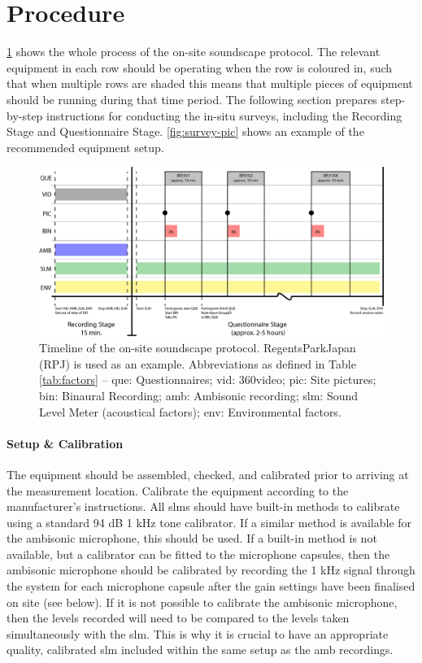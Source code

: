 \section{Procedure}
 \label{sec:proc}

 \cref{fig:timeline} shows the whole process of the on-site soundscape protocol. The relevant equipment in each row should be operating when the row is coloured in, such that when multiple rows are shaded this means that multiple pieces of equipment should be running during that time period. The following section prepares step-by-step instructions for conducting the in-situ surveys, including the Recording Stage and Questionnaire Stage. \cref{fig:survey-pic} shows an example of the recommended equipment setup.

 \begin{figure}[h]
   \centering
   \includegraphics[width=\textwidth]{Figures/Survey-Diagram_V2}
   \caption{Timeline of the on-site soundscape protocol. RegentsParkJapan (RPJ) is used as an example. Abbreviations as defined in Table \ref{tab:factors} -- \gls{que}: Questionnaires; \gls{vid}: 360\degree video; \gls{pic}: Site pictures; \gls{bin}: Binaural Recording; \gls{amb}: Ambisonic recording; \gls{slm}: Sound Level Meter (acoustical factors); \gls{env}: Environmental factors. \label{fig:timeline}}
 \end{figure}

 \paragraph*{Setup \& Calibration} The equipment should be assembled, checked, and calibrated prior to arriving at the measurement location. Calibrate the equipment according to the manufacturer's instructions. All \gls{slm}s should have built-in methods to calibrate using a standard 94 dB 1 kHz tone calibrator. If a similar method is available for the ambisonic microphone, this should be used. If a built-in method is not available, but a calibrator can be fitted to the microphone capsules, then the ambisonic microphone should be calibrated by recording the 1 kHz signal through the system for each microphone capsule after the gain settings have been finalised on site (see below). If it is not possible to calibrate the ambisonic microphone, then the levels recorded will need to be compared to the levels taken simultaneously with the \gls{slm}. This is why it is crucial to have an appropriate quality, calibrated \gls{slm} included within the same setup as the \gls{amb} recordings.

